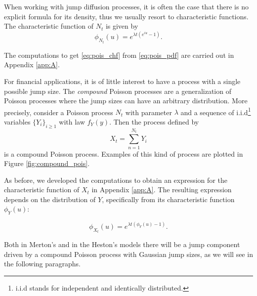 When working with jump diffusion processes, it is often the case that there is no explicit formula for its density, thus  we usually resort to characteristic functions. The characteristic function of $N_t$ is given by 
\begin{equation}
\label{eq:pois_chf}
	\phi_{N_t}(u)=e^{\lambda t (e^{iu}-1)}.
\end{equation}

The computations to get \eqref{eq:pois_chf} from \eqref{eq:pois_pdf} are carried out in Appendix \ref{app:A}. 

\bigskip
For financial applications, it is of little interest to have a process with a single possible jump size. The \textit{compound} Poisson processes are a generalization of Poisson processes  where  the jump sizes can have an arbitrary distribution. More precisely, consider a Poisson process $N_t$ with parameter $\lambda$ and a sequence of i.i.d\footnote{i.i.d stands for independent and identically distributed.} variables $\{Y_i\}_{i\geq 1}$ with law $f_Y(y)$. Then the process defined by
\begin{equation}
	X_t = \sum_{n=1}^{N_t} Y_i
\end{equation}
is a compound Poisson process. Examples of this kind of process are plotted in Figure \ref{fig:compound_pois}.

As before, we developed the computations to obtain an expression for the characteristic function of $X_t$ in Appendix \ref{app:A}. The resulting expression depends on the distribution of $Y$, specifically from its characteristic function $\phi_Y(u)$:

\begin{equation}
	\phi_{X_t}(u) = e^{\lambda t (\phi_Y(u)-1)}.
\end{equation}

Both in Merton's and in the Heston's models there will be a jump component driven by a compound Poisson process with Gaussian jump sizes, as we will see in the following paragraphs.

